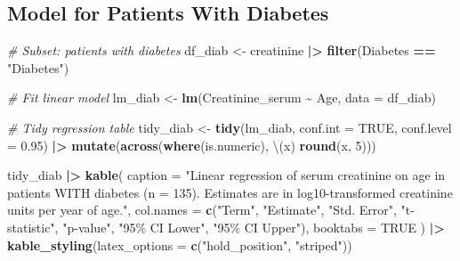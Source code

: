 \documentclass[
  12pt,
]{article}
\newenvironment{Shaded}{\begin{snugshade}}{\end{snugshade}}
\newcommand{\AttributeTok}[1]{\textcolor[rgb]{0.13,0.29,0.53}{#1}}
\newcommand{\CommentTok}[1]{\textcolor[rgb]{0.56,0.35,0.01}{\textit{#1}}}
\newcommand{\ConstantTok}[1]{\textcolor[rgb]{0.56,0.35,0.01}{#1}}
\newcommand{\DecValTok}[1]{\textcolor[rgb]{0.00,0.00,0.81}{#1}}
\newcommand{\FloatTok}[1]{\textcolor[rgb]{0.00,0.00,0.81}{#1}}
\newcommand{\FunctionTok}[1]{\textcolor[rgb]{0.13,0.29,0.53}{\textbf{#1}}}
\newcommand{\NormalTok}[1]{#1}
\newcommand{\OtherTok}[1]{\textcolor[rgb]{0.56,0.35,0.01}{#1}}
\newcommand{\SpecialCharTok}[1]{\textcolor[rgb]{0.81,0.36,0.00}{\textbf{#1}}}
\newcommand{\StringTok}[1]{\textcolor[rgb]{0.31,0.60,0.02}{#1}}
\begin{document}
\hypertarget{model-for-patients-with-diabetes}{%
\subsection{Model for Patients With
Diabetes}\label{model-for-patients-with-diabetes}}

\begin{Shaded}
\begin{Highlighting}[]
\CommentTok{\# Subset: patients with diabetes}
\NormalTok{df\_diab }\OtherTok{\textless{}{-}}\NormalTok{ creatinine }\SpecialCharTok{|\textgreater{}} \FunctionTok{filter}\NormalTok{(Diabetes }\SpecialCharTok{==} \StringTok{"Diabetes"}\NormalTok{)}

\CommentTok{\# Fit linear model}
\NormalTok{lm\_diab }\OtherTok{\textless{}{-}} \FunctionTok{lm}\NormalTok{(Creatinine\_serum }\SpecialCharTok{\textasciitilde{}}\NormalTok{ Age, }\AttributeTok{data =}\NormalTok{ df\_diab)}

\CommentTok{\# Tidy regression table}
\NormalTok{tidy\_diab }\OtherTok{\textless{}{-}} \FunctionTok{tidy}\NormalTok{(lm\_diab, }\AttributeTok{conf.int =} \ConstantTok{TRUE}\NormalTok{, }\AttributeTok{conf.level =} \FloatTok{0.95}\NormalTok{) }\SpecialCharTok{|\textgreater{}}
  \FunctionTok{mutate}\NormalTok{(}\FunctionTok{across}\NormalTok{(}\FunctionTok{where}\NormalTok{(is.numeric), \textbackslash{}(x) }\FunctionTok{round}\NormalTok{(x, }\DecValTok{5}\NormalTok{)))}

\NormalTok{tidy\_diab }\SpecialCharTok{|\textgreater{}}
  \FunctionTok{kable}\NormalTok{(}
    \AttributeTok{caption   =} \StringTok{"Linear regression of serum creatinine on age in patients WITH diabetes (n = 135). Estimates are in log10{-}transformed creatinine units per year of age."}\NormalTok{,}
    \AttributeTok{col.names =} \FunctionTok{c}\NormalTok{(}\StringTok{"Term"}\NormalTok{, }\StringTok{"Estimate"}\NormalTok{, }\StringTok{"Std. Error"}\NormalTok{, }\StringTok{"t{-}statistic"}\NormalTok{, }\StringTok{"p{-}value"}\NormalTok{, }\StringTok{"95\% CI Lower"}\NormalTok{, }\StringTok{"95\% CI Upper"}\NormalTok{),}
    \AttributeTok{booktabs  =} \ConstantTok{TRUE}
\NormalTok{  ) }\SpecialCharTok{|\textgreater{}}
  \FunctionTok{kable\_styling}\NormalTok{(}\AttributeTok{latex\_options =} \FunctionTok{c}\NormalTok{(}\StringTok{"hold\_position"}\NormalTok{, }\StringTok{"striped"}\NormalTok{))}
\end{Highlighting}
\end{Shaded}
\end{document}
